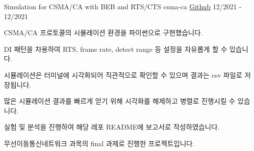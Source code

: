 \cventry
{Simulation for CSMA/CA with BEB and RTS/CTS}
{csma-ca}
{\href{https://github.com/hanchchch/csma-ca}{Github}}
{12/2021 - 12/2021}
\begin{cvitems}
\item {CSMA/CA 프로토콜의 시뮬레이션 환경을 파이썬으로 구현했습니다.}
\item {DI 패턴을 차용하여 RTS, frame rate, detect range 등 설정을 자유롭게 할 수 있습니다.}
\item {시뮬레이션은 터미널에 시각화되어 직관적으로 확인할 수 있으며 결과는 csv 파일로 저장됩니다.}
\item {많은 시뮬레이션 결과를 빠르게 얻기 위해 시각화를 해제하고 병렬로 진행시킬 수 있습니다.}
\item {실험 및 분석을 진행하여 해당 레포 README에 보고서로 작성하였습니다.}
\item {무선이동통신네트워크 과목의 final 과제로 진행한 프로젝트입니다.}
\end{cvitems}
